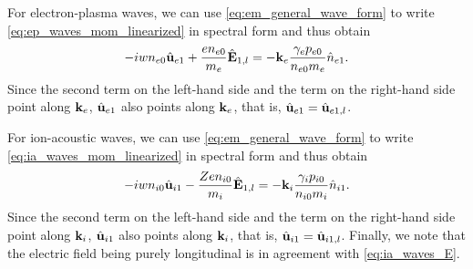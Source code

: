 \documentclass[a4paper,11pt]{report}
\begin{document}
For electron-plasma waves, we can use \cref{eq:em_general_wave_form} to write \cref{eq:ep_waves_mom_linearized} in spectral form and thus obtain
\begin{equation}
-i w n_{e0} \hat{\mathbf{u}}_{e1} + \frac{e n_{e0}}{m_e} \hat{\mathbf{E}}_{1,l} = -\mathbf{k}_e \frac{\gamma_e p_{e0}}{n_{e0} m_e} \hat{n}_{e1}. 
\end{equation}
Since the second term on the left-hand side and the term on the right-hand side point along $\mathbf{k}_e$, $\hat{\mathbf{u}}_{e1}$ also points along $\mathbf{k}_e$, that is, $\hat{\mathbf{u}}_{e1} = \hat{\mathbf{u}}_{e1,l}$.

For ion-acoustic waves, we can use \cref{eq:em_general_wave_form} to write \cref{eq:ia_waves_mom_linearized} in spectral form and thus obtain
\begin{equation}
-i w n_{i0} \hat{\mathbf{u}}_{i1} - \frac{Z e n_{i0}}{m_i} \hat{\mathbf{E}}_{1,l} = -\mathbf{k}_i \frac{\gamma_i p_{i0}}{n_{i0} m_i} \hat{n}_{i1}. 
\end{equation}
Since the second term on the left-hand side and the term on the right-hand side point along $\mathbf{k}_i$, $\hat{\mathbf{u}}_{i1}$ also points along $\mathbf{k}_i$, that is, $\hat{\mathbf{u}}_{i1} = \hat{\mathbf{u}}_{i1,l}$. Finally, we note that the electric field being purely longitudinal is in agreement with \cref{eq:ia_waves_E}.

\end{document}
